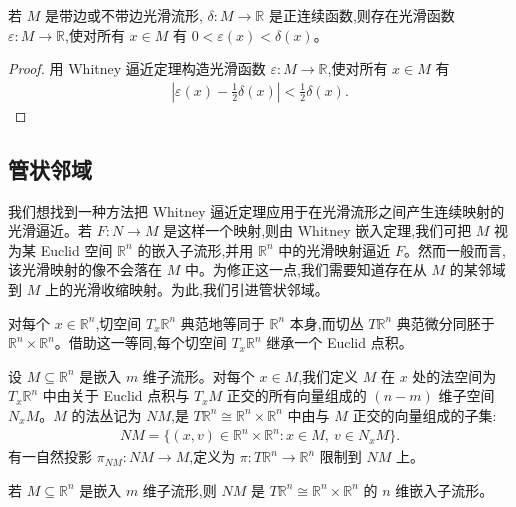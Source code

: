 \documentclass[../../main.tex]{subfiles}
\begin{document}
\begin{corollary}\label{corollary:ch06-small-positive-function}
若 $M$ 是带边或不带边光滑流形, $\delta:M\to\mathbb{R}$ 是正连续函数,则存在光滑函数 $\varepsilon:M\to\mathbb{R}$,使对所有 $x\in M$ 有 $0<\varepsilon(x)<\delta(x)$。
\end{corollary}

\begin{proof}
用 Whitney 逼近定理构造光滑函数 $\varepsilon:M\to\mathbb{R}$,使对所有 $x\in M$ 有
\begin{align*}
\left|\varepsilon(x)-\tfrac12\delta(x)\right|<\tfrac12\delta(x).
\end{align*}
\end{proof}

\subsection{管状邻域}\label{subsection:ch06-tubular}

我们想找到一种方法把 Whitney 逼近定理应用于在光滑流形之间产生连续映射的光滑逼近。若 $F:N\to M$ 是这样一个映射,则由 Whitney 嵌入定理,我们可把 $M$ 视为某 Euclid 空间 $\mathbb{R}^n$ 的嵌入子流形,并用 $\mathbb{R}^n$ 中的光滑映射逼近 $F$。然而一般而言,该光滑映射的像不会落在 $M$ 中。为修正这一点,我们需要知道存在从 $M$ 的某邻域到 $M$ 上的光滑收缩映射。为此,我们引进管状邻域。

对每个 $x\in\mathbb{R}^n$,切空间 $T_x\mathbb{R}^n$ 典范地等同于 $\mathbb{R}^n$ 本身,而切丛 $T\mathbb{R}^n$ 典范微分同胚于 $\mathbb{R}^n\times\mathbb{R}^n$。借助这一等同,每个切空间 $T_x\mathbb{R}^n$ 继承一个 Euclid 点积。

设 $M\subseteq\mathbb{R}^n$ 是嵌入 $m$ 维子流形。对每个 $x\in M$,我们定义 $M$ 在 $x$ 处的法空间为 $T_x\mathbb{R}^n$ 中由关于 Euclid 点积与 $T_xM$ 正交的所有向量组成的 $(n-m)$ 维子空间 $N_xM$。$M$ 的法丛记为 $NM$,是 $T\mathbb{R}^n\cong\mathbb{R}^n\times\mathbb{R}^n$ 中由与 $M$ 正交的向量组成的子集:
\begin{align*}
NM=\{(x,v)\in\mathbb{R}^n\times\mathbb{R}^n:x\in M,\ v\in N_xM\}.
\end{align*}
有一自然投影 $\pi_{NM}:NM\to M$,定义为 $\pi:T\mathbb{R}^n\to\mathbb{R}^n$ 限制到 $NM$ 上。

\begin{theorem}\label{theorem:ch06-normal-bundle-submanifold}
若 $M\subseteq\mathbb{R}^n$ 是嵌入 $m$ 维子流形,则 $NM$ 是 $T\mathbb{R}^n\cong\mathbb{R}^n\times\mathbb{R}^n$ 的 $n$ 维嵌入子流形。
\end{theorem}
\end{document}

